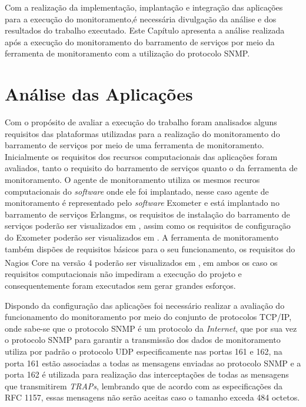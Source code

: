 \label{analise_monitoramento_servicos}

Com a realização da implementação, implantação e integração das aplicações para a execução do monitoramento,é necessária divulgação da análise e dos resultados do trabalho executado. Este Capítulo apresenta a análise realizada após a execução do monitoramento do barramento de serviços por meio da ferramenta de monitoramento com a utilização do protocolo \acrshort{SNMP}.


\section{Análise das Aplicações}
\label{analise}
Com o propósito de avaliar a execução do trabalho foram analisados alguns requisitos das plataformas utilizadas para a realização do monitoramento do barramento de serviços por meio de uma ferramenta de monitoramento. Inicialmente os requisitos dos recursos computacionais das aplicações foram avaliados, tanto o requisito do barramento de serviços quanto o da ferramenta de monitoramento. O agente de monitoramento utiliza os mesmos recuros computacionais do \textit{software} onde ele foi implantado, nesse caso agente de monitoramento é representado pelo \textit{software} Exometer e está implantado no barramento de serviços Erlangms, os requisitos de instalação do barramento de serviços poderão ser visualizados em \cite{erlangms_gitHub}, assim como os requisitos de configuração do Exometer poderão ser visualizados em \cite{exometer_gitHub} . A ferramenta de monitoramento também dispões de requisitos básicos para o seu funcionamento, os requisitos do Nagios Core\textsuperscript{\textregistered} na versão 4 poderão ser visualizados em \cite{nagios_core_configuration}, em ambos os caso os requisitos computacionais não impediram a execução do projeto e consequentemente foram executados sem gerar grandes esforços.

Dispondo da configuração das aplicações foi necessário realizar a avaliação do funcionamento do monitoramento por meio do conjunto de protocolos TCP/IP, onde sabe-se que o protocolo \acrshort{SNMP} é um protocolo da \textit{Internet}, que por sua vez o protocolo \acrshort{SNMP} para garantir a transmissão dos dados de monitoramento utiliza por padrão o protocolo UDP especificamente nas portas 161 e 162, na porta 161 estão associadas a todas as mensagens enviadas ao protocolo \acrshort{SNMP} e a porta 162 é utilizada para realização das interceptações de todas as mensagens que transmitirem \textit{TRAPs}, lembrando que de acordo com as especificações da RFC 1157, essas mensagens não serão aceitas caso o tamanho exceda 484 octetos\cite{Schoffstall}. 

